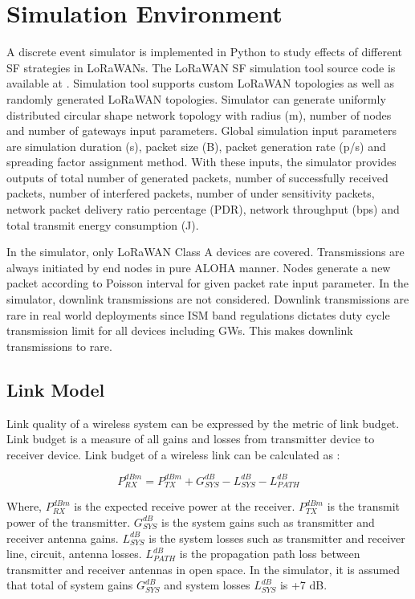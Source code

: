 \documentclass[conference]{IEEEtran}
\begin{document}
\section{Simulation Environment} \label{Simulation Environment}
\par A discrete event simulator is implemented in Python to study effects of different SF strategies in LoRaWANs. The LoRaWAN SF simulation tool source code is available at \cite{simlorasf}. Simulation tool supports custom LoRaWAN topologies as well as randomly generated LoRaWAN topologies. Simulator can generate uniformly distributed circular shape network topology with radius (m), number of nodes and number of gateways input parameters. Global simulation input parameters are simulation duration (s), packet size (B), packet generation rate (p/s) and spreading factor assignment method. With these inputs, the simulator provides outputs of total number of generated packets, number of successfully received packets, number of interfered packets, number of under sensitivity packets, network packet delivery ratio percentage (PDR), network throughput (bps) and total transmit energy consumption (J).

\par In the simulator, only LoRaWAN Class A devices are covered. Transmissions are always initiated by end nodes in pure ALOHA manner. Nodes generate a new packet according to Poisson interval for given packet rate input parameter. In the simulator, downlink transmissions are not considered. Downlink transmissions are rare in real world deployments since ISM band regulations dictates duty cycle transmission limit for all devices including GWs. This makes downlink transmissions to rare.

\subsection{Link Model}
\par Link quality of a wireless system can be expressed by the metric of link budget. Link budget is a measure of all gains and losses from transmitter device to receiver device. Link budget of a wireless link can be calculated as \cite{AN1200.22}:

\begin{equation} \label{eq:expected_rx_power}
P^{dBm}_{RX} = P^{dBm}_{TX} + G^{dB}_{SYS} - L^{dB}_{SYS} - L^{dB}_{PATH}
\end{equation}

\par Where, $P^{dBm}_{RX}$ is the expected receive power at the receiver. $P^{dBm}_{TX}$ is the transmit power of the transmitter. $G^{dB}_{SYS}$ is the system gains such as transmitter and receiver antenna gains. $L^{dB}_{SYS}$ is the system losses such as transmitter and receiver line, circuit, antenna losses. $L^{dB}_{PATH}$ is the propagation path loss between transmitter and receiver antennas in open space. In the simulator, it is assumed that total of system gains $G^{dB}_{SYS}$ and system losses $L^{dB}_{SYS}$ is +7 dB.
\end{document}

